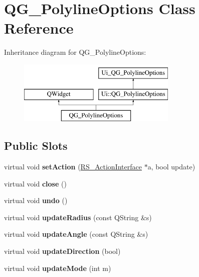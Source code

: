 \hypertarget{classQG__PolylineOptions}{\section{Q\-G\-\_\-\-Polyline\-Options Class Reference}
\label{classQG__PolylineOptions}
}
Inheritance diagram for Q\-G\-\_\-\-Polyline\-Options\-:\begin{figure}[H]
\begin{center}
\leavevmode
\includegraphics[height=3.000000cm]{classQG__PolylineOptions}
\end{center}
\end{figure}
\subsection*{Public Slots}
\begin{DoxyCompactItemize}
\item 
\hypertarget{classQG__PolylineOptions_a8be0589ca8f3fa3bed9294147f8a64a8}{virtual void {\bfseries set\-Action} (\hyperlink{classRS__ActionInterface}{R\-S\-\_\-\-Action\-Interface} $\ast$a, bool update)}\label{classQG__PolylineOptions_a8be0589ca8f3fa3bed9294147f8a64a8}

\item 
\hypertarget{classQG__PolylineOptions_a9fd0b0b295ce6815193a552ec4a78ed6}{virtual void {\bfseries close} ()}\label{classQG__PolylineOptions_a9fd0b0b295ce6815193a552ec4a78ed6}

\item 
\hypertarget{classQG__PolylineOptions_ab6e82e078c99e2f5ccf8fd558c2c67e1}{virtual void {\bfseries undo} ()}\label{classQG__PolylineOptions_ab6e82e078c99e2f5ccf8fd558c2c67e1}

\item 
\hypertarget{classQG__PolylineOptions_a2c980a204fba5560ffe678ebecfd4a8d}{virtual void {\bfseries update\-Radius} (const Q\-String \&s)}\label{classQG__PolylineOptions_a2c980a204fba5560ffe678ebecfd4a8d}

\item 
\hypertarget{classQG__PolylineOptions_a4a6c7bfbe081de14f445fdd52925d550}{virtual void {\bfseries update\-Angle} (const Q\-String \&s)}\label{classQG__PolylineOptions_a4a6c7bfbe081de14f445fdd52925d550}

\item 
\hypertarget{classQG__PolylineOptions_aada8bdf3848fa5280945047037aea92e}{virtual void {\bfseries update\-Direction} (bool)}\label{classQG__PolylineOptions_aada8bdf3848fa5280945047037aea92e}

\item 
\hypertarget{classQG__PolylineOptions_a32166eb05e781ff6259e61d6bab38cd4}{virtual void {\bfseries update\-Mode} (int m)}\label{classQG__PolylineOptions_a32166eb05e781ff6259e61d6bab38cd4}

\end{DoxyCompactItemize}
